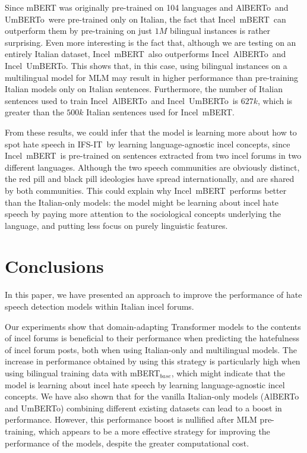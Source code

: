 \documentclass[11pt]{article}
\newcommand{\dsITclassification}{IFS-IT}
\newcommand{\mbert}{\mbox{mBERT$_{base}$}}
\newcommand{\imbert}{\mbox{Incel mBERT}}
\newcommand{\umbert}{\mbox{UmBERTo}}
\newcommand{\albert}{\mbox{AlBERTo}}
\newcommand{\iumbert}{\mbox{Incel UmBERTo}}
\newcommand{\ialbert}{\mbox{Incel AlBERTo}}
\begin{document}
Since mBERT was originally pre-trained on 104 languages and \albert\, and \umbert\, were pre-trained only on Italian, the fact that \imbert\, can outperform them by pre-training on just $1M$ bilingual instances is rather surprising. Even more interesting is the fact that, although we are testing on an entirely Italian dataset, \imbert\, also outperforms \ialbert\, and \iumbert. This shows that, in this case, using bilingual instances on a multilingual model for MLM may result in higher performance than pre-training Italian models only on Italian sentences. Furthermore, the number of Italian sentences used to train \ialbert\, and \iumbert\, is $627k$, which is greater than the $500k$ Italian sentences used for \imbert.

From these results, we could infer that the model is learning more about how to spot hate speech in \dsITclassification\, by learning language-agnostic incel concepts, since \imbert\, is pre-trained on sentences extracted from two incel forums in two different languages. Although the two speech communities are obviously distinct, the red pill and black pill ideologies have spread internationally, and are shared by both communities. This could explain why \imbert\, performs better than the Italian-only models: the model might be learning about incel hate speech by paying more attention to the sociological concepts underlying the language, and putting less focus on purely linguistic features.


\section{Conclusions}

In this paper, we have presented an approach to improve the performance of hate speech detection models within Italian incel forums.

Our experiments show that domain-adapting Transformer models to the contents of incel forums is beneficial to their performance when predicting the hatefulness of incel forum posts, both when using Italian-only and multilingual models. The increase in performance obtained by using this strategy is particularly high when using bilingual training data with \mbert, which might indicate that the model is learning about incel hate speech by learning language-agnostic incel concepts.
We have also shown that for the vanilla Italian-only models (\albert\, and \umbert) combining different existing datasets can lead to a boost in performance. However, this performance boost is nullified after MLM pre-training, which appears to be a more effective strategy for improving the performance of the models, despite the greater computational cost.
\end{document}
